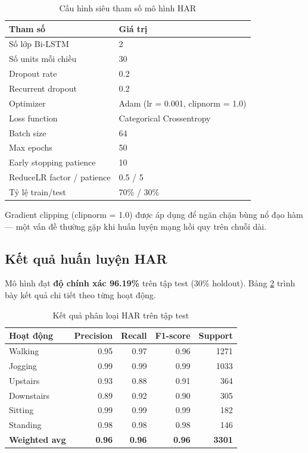 \begin{table}[H]
\centering
\caption{Cấu hình siêu tham số mô hình HAR}
\label{tab:har_hyperparams}
\begin{tabular}{|l|l|}
\hline
\textbf{Tham số} & \textbf{Giá trị} \\
\hline
Số lớp Bi-LSTM                & 2 \\
Số units mỗi chiều            & 30 \\
Dropout rate                   & 0.2 \\
Recurrent dropout              & 0.2 \\
Optimizer                      & Adam (lr = 0.001, clipnorm = 1.0) \\
Loss function                  & Categorical Crossentropy \\
Batch size                     & 64 \\
Max epochs                     & 50 \\
Early stopping patience        & 10 \\
ReduceLR factor / patience     & 0.5 / 5 \\
Tỷ lệ train/test               & 70\% / 30\% \\
\hline
\end{tabular}
\end{table}

Gradient clipping (clipnorm = 1.0) được áp dụng để ngăn chặn bùng nổ đạo hàm — một vấn đề thường gặp khi huấn luyện mạng hồi quy trên chuỗi dài.

\subsection{Kết quả huấn luyện HAR}
\label{subsec:har_results}

Mô hình đạt \textbf{độ chính xác 96.19\%} trên tập test (30\% holdout). Bảng \ref{tab:har_confusion} trình bày kết quả chi tiết theo từng hoạt động.

\begin{table}[H]
\centering
\caption{Kết quả phân loại HAR trên tập test}
\label{tab:har_confusion}
\begin{tabular}{|l|r|r|r|r|}
\hline
\textbf{Hoạt động} & \textbf{Precision} & \textbf{Recall} & \textbf{F1-score} & \textbf{Support} \\
\hline
Walking     & 0.95 & 0.97 & 0.96 & 1271 \\
Jogging     & 0.99 & 0.99 & 0.99 & 1033 \\
Upstairs    & 0.93 & 0.88 & 0.91 & 364 \\
Downstairs  & 0.89 & 0.92 & 0.90 & 305 \\
Sitting     & 0.99 & 0.99 & 0.99 & 182 \\
Standing    & 0.98 & 0.98 & 0.98 & 146 \\
\hline
\textbf{Weighted avg} & \textbf{0.96} & \textbf{0.96} & \textbf{0.96} & \textbf{3301} \\
\hline
\end{tabular}
\end{table}

